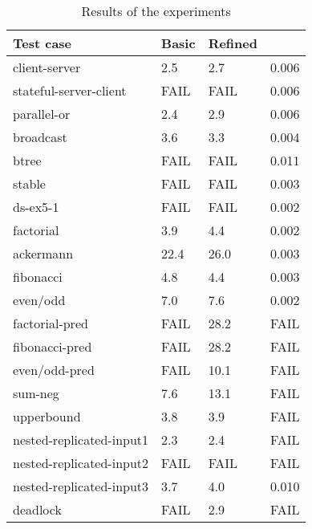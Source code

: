 \begin{table}[tbp]
    \centering
    \caption{Results of the experiments}
    \begin{tabular}{ZYYY}
        \hline
        Test case & Basic & Refined & \typical{} \\ \hline \hline
        client-server   &  2.5 &  2.7 & 0.006 \\
        stateful-server-client & FAIL & FAIL & 0.006 \\
        parallel-or     &  2.4 &  2.9 & 0.006 \\
        broadcast       &  3.6 &  3.3 & 0.004 \\
        btree           & FAIL & FAIL & 0.011 \\
        stable          & FAIL & FAIL & 0.003 \\
        ds-ex5-1        & FAIL & FAIL & 0.002 \\
        factorial       &  3.9 &  4.4 & 0.002 \\
        ackermann       & 22.4 & 26.0 & 0.003 \\
        \hline
        fibonacci       &  4.8 &  4.4 & 0.003 \\
        even/odd        &  7.0 &  7.6 & 0.002 \\
        factorial-pred  & FAIL & 28.2 & FAIL  \\
        fibonacci-pred  & FAIL & 28.2 & FAIL  \\ 
        even/odd-pred   & FAIL & 10.1 & FAIL  \\
        sum-neg         &  7.6 & 13.1 & FAIL  \\
        upperbound      &  3.8 &  3.9 & FAIL  \\
        nested-replicated-input1    &  2.3 &  2.4 & FAIL  \\
        nested-replicated-input2    & FAIL & FAIL & FAIL  \\
        nested-replicated-input3    &  3.7 &  4.0 & 0.010 \\
        deadlock        & FAIL &  2.9 & FAIL  \\
        \hline
    \end{tabular}
    \label{tab:result}
\end{table}


